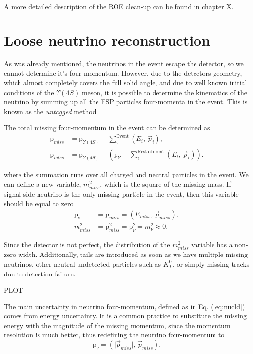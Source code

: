 \documentclass[oneside,a4paper,openany,12pt]{scrbook}
\begin{document}
A more detailed description of the ROE clean-up can be found in chapter X.

\section{Loose neutrino reconstruction}

As was already mentioned, the neutrinos in the event escape the detector, so we cannot determine it's four-momentum. However, due to the detectors geometry, which almost completely covers the full solid angle, and due to well known initial conditions of the $\Upsilon(4S)$ meson, it is possible to determine the kinematics of the neutrino by summing up all the FSP particles four-momenta in the event. This is known as the \textit{untagged} method.

The total missing four-momentum in the event can be determined as
\begin{align}
\mathrm{p}_{miss} &= \mathrm{p}_{\Upsilon(4S)} - \sum_i^{\mathrm{Event}}\left(E_i,\,\vec{p}_i \right),\\
\mathrm{p}_{miss} &= \mathrm{p}_{\Upsilon(4S)} - \left(\mathrm{p}_{Y} -\sum_i^{\mathrm{Rest~of~event}}\left(E_i,\,\vec{p}_i \right)\right).
\end{align}

where the summation runs over all charged and neutral particles in the event. We can define a new variable, $m_{miss}^2$, which is the square of the missing mass. If signal side neutrino is the only missing particle in the event, then this variable should be equal to zero
\begin{align}
\label{eq:nuold}
\mathrm{p}_\nu &= \mathrm{p}_{miss} = \left(E_{miss},\,\vec{p}_{miss} \right),\\
m_{miss}^2 &= \mathrm{p}_{miss}^2 = \mathrm{p}_{\nu}^2 = m_\nu^2 \approx 0.
\end{align}

Since the detector is not perfect, the distribution of the $m_{miss}^2$ variable has a non-zero width. Additionally, tails are introduced as soon as we have multiple missing neutrinos, other neutral undetected particles such as $K_L^0$, or simply missing tracks due to detection failure.

\begin{center}
PLOT
\end{center}

The main uncertainty in neutrino four-momentum, defined as in Eq. (\ref{eq:nuold}) comes from energy uncertainty. It is a common practice to substitute the missing energy with the magnitude of the missing momentum, since the momentum resolution is much better, thus redefining the neutrino four-momentum to
\begin{equation}
\label{eq:nunew}
\mathrm{p}_\nu = \left(\vert \vec{p}_{miss} \vert,\,\vec{p}_{miss} \right).
\end{equation}
\end{document}
